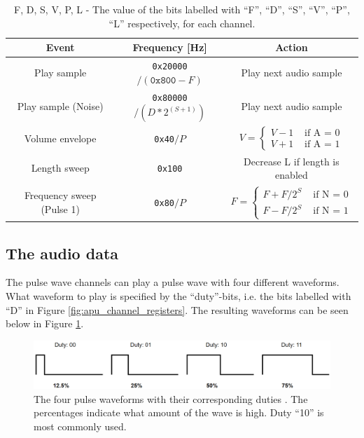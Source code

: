 \begin{table}[H]
    \centering
    \begin{tabular}{|c|c|c|}
        \hline
        \textbf{Event} & \textbf{Frequency [Hz]} & \textbf{Action} \\
        \hline
        Play sample & \texttt{0x20000}$/(\texttt{0x800} - F)$ & Play next audio sample \\
        \hline
        Play sample (Noise) & \texttt{0x80000}$/ (D * 2 ^ {(S + 1)})$ & Play next audio sample \\
        \hline
        Volume envelope & \texttt{0x40}$/P$ & 
        $V =
        \begin{cases}
            V - 1  & \text{ if A = 0} \\
            V + 1 & \text{ if A = 1}
        \end{cases}$ \\
        \hline
        Length sweep & \texttt{0x100} & Decrease L if length is enabled\\
        \hline
        Frequency sweep (Pulse 1) & \texttt{0x80}$/P$ &
        $F =
        \begin{cases}
            F + F/2^{S}  & \text{ if N = 0} \\
            F - F/2^{S} & \text{ if N = 1}
        \end{cases}$\\
        \hline
    \end{tabular}
    \caption{F, D, S, V, P, L - The value of the bits labelled with ``F'', ``D'', ``S'', ``V'', ``P'', ``L'' respectively, for each channel.}
    \label{tab:frequent_events_apu}
    
\end{table}
      
\subsection{The audio data} \label{sec:theAudioData}
    The pulse wave channels can play a pulse wave with four different waveforms. What waveform to play is specified by the ``duty''-bits, i.e. the bits labelled with ``D'' in Figure \ref{fig:apu_channel_registers}. The resulting waveforms can be seen below in Figure \ref{fig:square_wave_forms}.
        
\begin{figure}[H]
    \centering
    \includegraphics[width=\textwidth]{figures/APU/square_waveforms.png}
    \caption{The four pulse waveforms with their corresponding duties \cite{AudioHardware}. The percentages indicate what amount of the wave is high. Duty ``10'' is   most commonly used.}
    \label{fig:square_wave_forms}
\end{figure}

